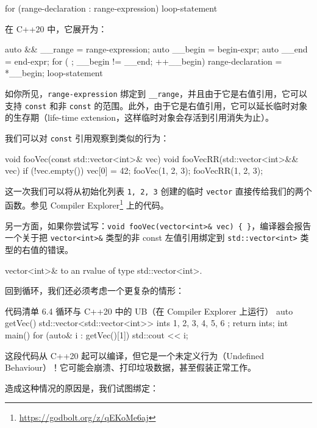 \begin{codebox}[cpp]
for (range-declaration : range-expression) loop-statement
\end{codebox}

在 C++20 中，它展开为：

\begin{codebox}[cpp]
auto && __range = range-expression;
auto __begin = begin-expr;
auto __end = end-expr;
for ( ; __begin != __end; ++__begin) {
range-declaration = *__begin;
loop-statement
}
\end{codebox}

如你所见，\texttt{range-expression} 绑定到 \texttt{\_\_range}，并且由于它是右值引用，它可以支持 \texttt{const} 和非 \texttt{const} 的范围。此外，由于它是右值引用，它可以延长临时对象的生存期（life-time extension，这样临时对象会存活到引用消失为止）。

我们可以对 \texttt{const} 引用观察到类似的行为：

\begin{codebox}[cpp]
void fooVec(const std::vector<int>& vec) { }
void fooVecRR(std::vector<int>&& vec) {
if (!vec.empty())
vec[0] = 42;
}
fooVec({1, 2, 3});
fooVecRR({1, 2, 3});
\end{codebox}

这一次我们可以将从初始化列表 \texttt{{1, 2, 3}} 创建的临时 \texttt{vector} 直接传给我们的两个函数。参见 Compiler Explorer\footnote{\url{https://godbolt.org/z/qEKoMe6aj}} 上的代码。

另一方面，如果你尝试写：\texttt{void fooVec(vector<int>\& vec) \{ \}}，编译器会报告一个关于把 \texttt{vector<int>\&} 类型的非 const 左值引用绑定到 \texttt{std::vector<int>} 类型的右值的错误。

\begin{codebox}[cpp]
vector<int>& to an rvalue of type std::vector<int>.
\end{codebox}

回到循环，我们还必须考虑一个更复杂的情形：

\begin{codeboxt}[cpp]{代码清单 6.4 循环与 C++20 中的 UB（在 Compiler Explorer 上运行）}
auto getVec() {
std::vector<std::vector<int>> ints { {1, 2}, {3, 4}, {5, 6} };
return ints;
}
int main() {
for (auto& i : getVec()[1])
std::cout << i;
}
\end{codeboxt}

这段代码从 C++20 起可以编译，但它是一个未定义行为（Undefined Behaviour）！它可能会崩溃、打印垃圾数据，甚至假装正常工作。

造成这种情况的原因是，我们试图绑定：

